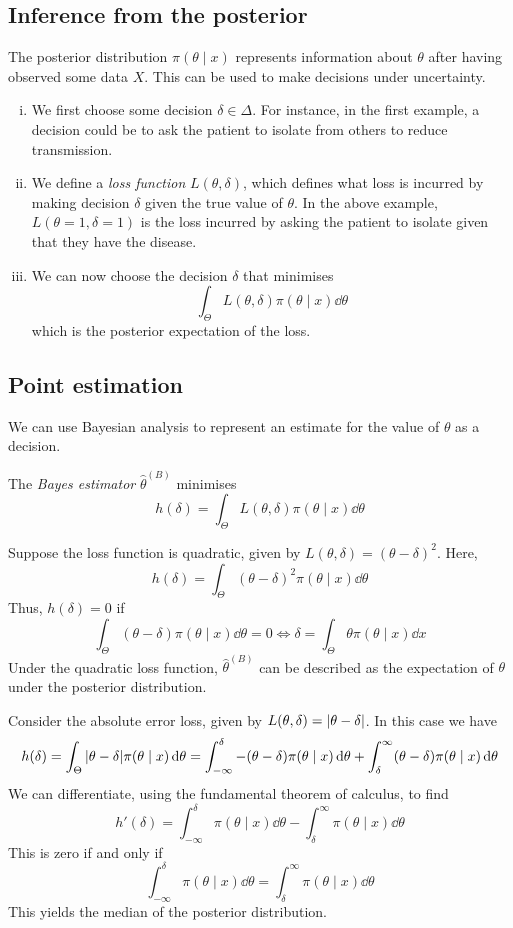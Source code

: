 \subsection{Inference from the posterior}
The posterior distribution \( \pi(\theta \mid x) \) represents information about \( \theta \) after having observed some data \( X \).
This can be used to make decisions under uncertainty.
\begin{enumerate}[(i)]
	\item We first choose some decision \( \delta \in \Delta \).
		For instance, in the first example, a decision could be to ask the patient to isolate from others to reduce transmission.
	\item We define a \textit{loss function} \( L(\theta,\delta) \), which defines what loss is incurred by making decision \( \delta \) given the true value of \( \theta \).
		In the above example, \( L(\theta = 1, \delta = 1) \) is the loss incurred by asking the patient to isolate given that they have the disease.
	\item We can now choose the decision \( \delta \) that minimises
		\[ \int_\Theta L(\theta, \delta) \pi(\theta \mid x) \dd{\theta} \]
		which is the posterior expectation of the loss.
\end{enumerate}

\subsection{Point estimation}
We can use Bayesian analysis to represent an estimate for the value of \( \theta \) as a decision.
\begin{definition}
	The \textit{Bayes estimator} \( \hat \theta^{(B)} \) minimises
	\[ h(\delta) = \int_\Theta L(\theta, \delta) \pi(\theta \mid x) \dd{\theta} \]
\end{definition}
\begin{example}
	Suppose the loss function is quadratic, given by \( L(\theta, \delta) = (\theta-\delta)^2 \).
	Here,
	\[ h(\delta) = \int_\Theta (\theta - \delta)^2 \pi(\theta \mid x) \dd{\theta} \]
	Thus, \( h(\delta) = 0 \) if
	\[ \int_\Theta (\theta - \delta) \pi(\theta \mid x) \dd{\theta} = 0 \iff \delta = \int_\Theta \theta \pi(\theta \mid x) \dd{x} \]
	Under the quadratic loss function, \( \hat \theta^{(B)} \) can be described as the expectation of \( \theta \) under the posterior distribution.
\end{example}
\begin{example}
	Consider the absolute error loss, given by \( L(\theta, \delta) = \abs{\theta - \delta} \).
	In this case we have
	\[ h(\delta) = \int_\Theta \abs{\theta - \delta} \pi(\theta \mid x) \dd{\theta} = \int_{-\infty}^\delta -(\theta-\delta)\pi(\theta \mid x)\dd{\theta} + \int_\delta^\infty (\theta-\delta)\pi(\theta \mid x)\dd{\theta} \]
	We can differentiate, using the fundamental theorem of calculus, to find
	\[ h'(\delta) = \int_{-\infty}^\delta \pi(\theta\mid x) \dd{\theta} - \int_\delta^\infty \pi(\theta \mid x)\dd{\theta} \]
	This is zero if and only if
	\[ \int_{-\infty}^\delta \pi(\theta\mid x) \dd{\theta} = \int_\delta^{\infty} \pi(\theta \mid x) \dd{\theta} \]
	This yields the median of the posterior distribution.
\end{example}

